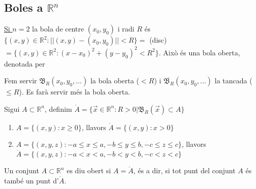 \documentclass[../main.tex]{subfiles}
\begin{document}
    \subsection{Boles a \texorpdfstring{$\mathbb{R}^n$}{Diverses dimensions}}
    \underline{Si $n=2$} la bola de centre $(x_0, y_0)$ i radi $R$ és $\{(x,y) \in \mathbb{R}^2: ||(x,y)-(x_0, y_0)|| < R\} =$
    (disc) $= \{(x,y)\in \mathbb{R}^2: (x-x_0)^2+(y-y_0)^2<R^2\}$. Això és una bola oberta, denotada per
    \begin{notacio}
        Fem servir $\mathfrak{B}_R(x_0, y_0, \dots)$ la bola oberta ($< R$) i $\overline{\mathfrak{B}_R}(x_0, y_0, \dots)$
        la tancada ($\leq R$). Es farà servir més la bola oberta.
    \end{notacio}
    \begin{definicio}
        Sigui $A \subset \mathbb{R}^n$, definim $\mathring{A} = \{\vec{x} \in \mathbb{R}^n : R > 0 | \mathfrak{B}_R(\vec{x}) \subset A\}$
    \end{definicio}
    \begin{exemple}
        \begin{enumerate}
            \item $A = \{(x,y):x \geq 0\}$, llavors $\mathring{A} = \{(x,y):x > 0\}$
            \item $A = \{(x,y,z):-a \leq x \leq a, -b \leq y \leq b, -c \leq z \leq c\}$, llavors
            $\mathring{A} = \{(x,y,z):-a < x < a, -b < y < b, -c < z < c\}$
        \end{enumerate}
    \end{exemple}
    \begin{definicio}
        Un conjunt $A \subset \mathbb{R}^n$ es diu obert si $A = \mathring{A}$, és a dir, si tot
        punt del conjunt $A$ és també un punt d'$\mathring{A}$.
    \end{definicio}
\end{document}

